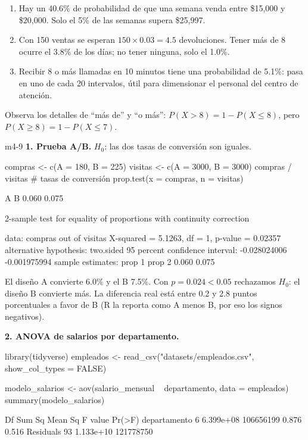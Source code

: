 \begin{enumerate}
  \item Hay un 40.6\% de probabilidad de que una semana venda entre
        \$15,000 y \$20,000. Solo el 5\% de las semanas supera \$25,997.
  \item Con 150 ventas se esperan $150 \times 0.03 = 4.5$ devoluciones. Tener
        más de 8 ocurre el 3.8\% de los días; no tener ninguna, solo el
        1.0\%.
  \item Recibir 8 o más llamadas en 10 minutos tiene una probabilidad de
        5.1\%: pasa en uno de cada 20 intervalos, útil para dimensionar el
        personal del centro de atención.
\end{enumerate}
Observa los detalles de ``más de'' y ``o más'': $P(X > 8) = 1 - P(X \leq 8)$,
pero $P(X \geq 8) = 1 - P(X \leq 7)$.


\begin{solucion}{m4-9}
\textbf{1. Prueba A/B.} $H_0$: las dos tasas de conversión son iguales.
\end{solucion}

\begin{rcode}
compras <- c(A = 180, B = 225)
visitas <- c(A = 3000, B = 3000)
compras / visitas                    # tasas de conversión
prop.test(x = compras, n = visitas)
\end{rcode}
\begin{rsalida}
    A     B
0.060 0.075

        2-sample test for equality of proportions with continuity
        correction

data:  compras out of visitas
X-squared = 5.1263, df = 1, p-value = 0.02357
alternative hypothesis: two.sided
95 percent confidence interval:
 -0.028024006 -0.001975994
sample estimates:
prop 1 prop 2
 0.060  0.075
\end{rsalida}

El diseño A convierte 6.0\% y el B 7.5\%. Con $p = 0.024 < 0.05$ rechazamos
$H_0$: el diseño B convierte más. La diferencia real está entre 0.2 y 2.8
puntos porcentuales a favor de B (R la reporta como A menos B, por eso los
signos negativos).

\textbf{2. ANOVA de salarios por departamento.}

\begin{rcode}
library(tidyverse)
empleados <- read_csv("datasets/empleados.csv", show_col_types = FALSE)
\end{rcode}

\begin{rcode}
modelo_salarios <- aov(salario_mensual ~ departamento, data = empleados)
summary(modelo_salarios)
\end{rcode}
\begin{rsalida}
             Df    Sum Sq   Mean Sq F value Pr(>F)
departamento  6 6.399e+08 106656199   0.876  0.516
Residuals    93 1.133e+10 121778750
\end{rsalida}

